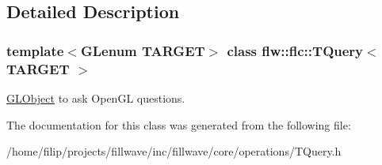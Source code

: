 \subsection{Detailed Description}
\subsubsection*{template$<$G\+Lenum T\+A\+R\+G\+ET$>$\newline
class flw\+::flc\+::\+T\+Query$<$ T\+A\+R\+G\+E\+T $>$}

\hyperlink{classflw_1_1flc_1_1GLObject}{G\+L\+Object} to ask Open\+GL questions. 

The documentation for this class was generated from the following file\+:\begin{DoxyCompactItemize}
\item 
/home/filip/projects/fillwave/inc/fillwave/core/operations/T\+Query.\+h\end{DoxyCompactItemize}
